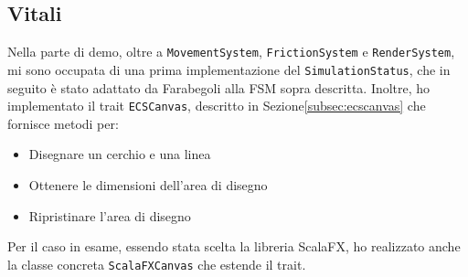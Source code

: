 \subsection{Vitali}\label{subsec:demo-vitali}
Nella parte di demo, oltre a \texttt{MovementSystem}, \texttt{FrictionSystem} e \texttt{RenderSystem},
mi sono occupata di una prima implementazione del \texttt{SimulationStatus}, che in seguito è stato adattato da
Farabegoli alla FSM sopra descritta.
Inoltre, ho implementato il trait \texttt{ECSCanvas}, descritto in Sezione\ref{subsec:ecscanvas} che fornisce metodi per:
\begin{itemize}
    \item Disegnare un cerchio e una linea
    \item Ottenere le dimensioni dell'area di disegno
    \item Ripristinare l'area di disegno
\end{itemize}
Per il caso in esame, essendo stata scelta la libreria ScalaFX, ho realizzato anche la classe concreta
\texttt{ScalaFXCanvas} che estende il trait.

